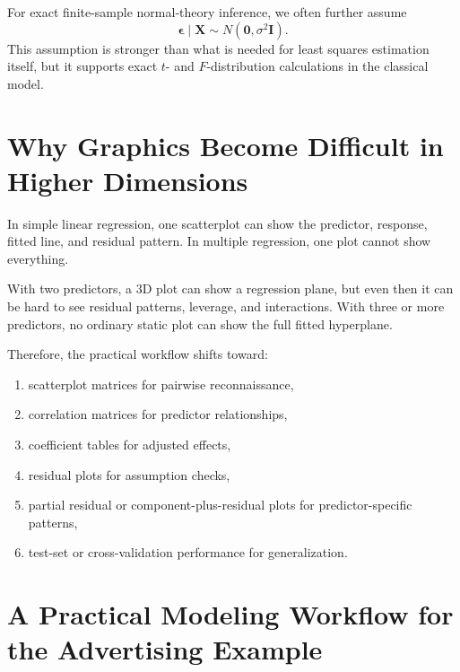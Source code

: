 For exact finite-sample normal-theory inference, we often further assume
\begin{equation}
  \boldsymbol{\epsilon}\mid\mathbf{X}\sim N(\mathbf{0},\sigma^2\mathbf{I}).
\end{equation}
This assumption is stronger than what is needed for least squares estimation itself, but it supports exact \(t\)- and \(F\)-distribution calculations in the classical model.

\section{Why Graphics Become Difficult in Higher Dimensions}

In simple linear regression, one scatterplot can show the predictor, response, fitted line, and residual pattern.  In multiple regression, one plot cannot show everything.

With two predictors, a 3D plot can show a regression plane, but even then it can be hard to see residual patterns, leverage, and interactions.  With three or more predictors, no ordinary static plot can show the full fitted hyperplane.

Therefore, the practical workflow shifts toward:
\begin{enumerate}
  \item scatterplot matrices for pairwise reconnaissance,
  \item correlation matrices for predictor relationships,
  \item coefficient tables for adjusted effects,
  \item residual plots for assumption checks,
  \item partial residual or component-plus-residual plots for predictor-specific patterns,
  \item test-set or cross-validation performance for generalization.
\end{enumerate}

\section{A Practical Modeling Workflow for the Advertising Example}

